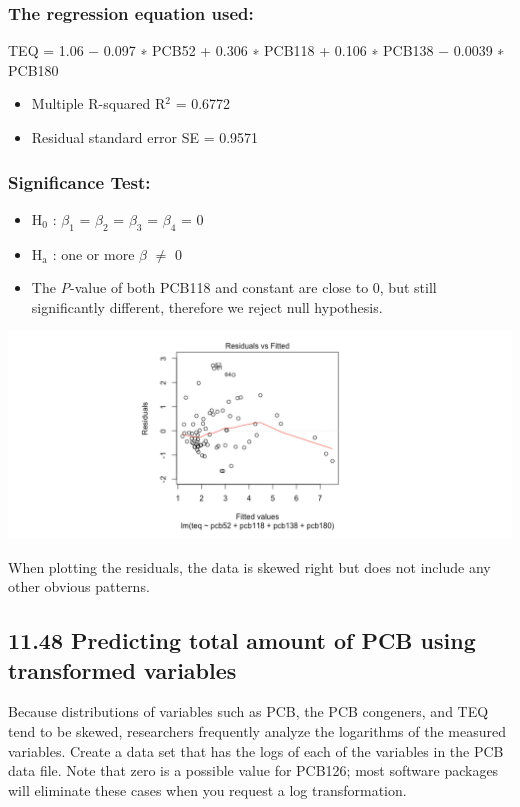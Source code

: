 \documentclass[11pt]{article}
\begin{document}
\subsubsection*{The regression equation used:}
\label{sec:orgd1c87f5}
TEQ = 1.06 − 0.097 ∗ PCB52 + 0.306 ∗ PCB118 + 0.106 ∗ PCB138 − 0.0039 ∗ PCB180
\begin{itemize}
\item Multiple R-squared R\(^{\text{2}}\) = 0.6772
\item Residual standard error SE = 0.9571
\end{itemize}

\subsubsection*{Significance Test:}
\label{sec:org92d46fa}
\begin{itemize}
\item H\(_{\text{0}}\) : \(\beta_{\text{1}}\) = \(\beta_{\text{2}}\) = \(\beta_{\text{3}}\) = \(\beta_{\text{4}}\) = 0
\item H\(_{\text{a}}\) : one or more \(\beta\) \(\neq\) 0
\item The \emph{P}-value of both PCB118 and constant are close to 0, but still significantly different, therefore we reject null hypothesis.
\end{itemize}

\begin{center}
\includegraphics[width=.9\linewidth]{./graphs/image7.png}
\end{center}
When plotting the residuals, the data is skewed right but does not include any other obvious patterns. 

\subsection*{11.48 Predicting total amount of PCB using transformed variables}
\label{sec:orgc5bbb95}
Because distributions of variables such as PCB, the PCB congeners, and TEQ tend to be skewed, researchers frequently analyze the logarithms of the measured variables. Create a data set that has the logs of each of the variables in the PCB data file. Note that zero is a possible value for PCB126; most software packages will eliminate these cases when you request a log transformation.
\end{document}
